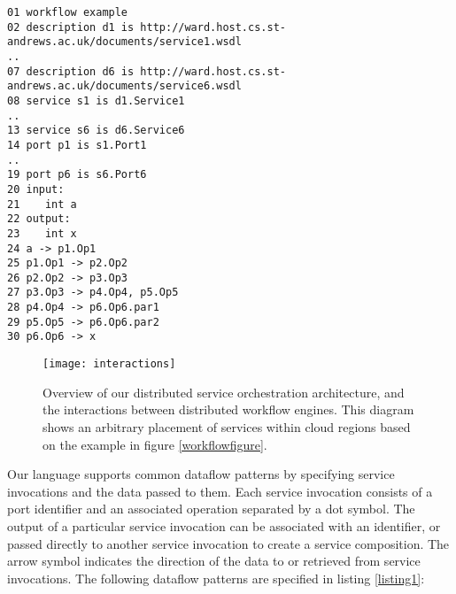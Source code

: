 \documentclass[10pt, conference, compsocconf]{IEEEtran}
\begin{document}
\begin{lstlisting}[keywords={workflow, specification, engine, description, service, port, engine, is, input, output, int, any}, caption={Specification of the workflow in figure \ref{workflowfigure}.}, label={listing1}, frame=single]
01 workflow example
02 description d1 is http://ward.host.cs.st-andrews.ac.uk/documents/service1.wsdl
..
07 description d6 is http://ward.host.cs.st-andrews.ac.uk/documents/service6.wsdl
08 service s1 is d1.Service1
..
13 service s6 is d6.Service6
14 port p1 is s1.Port1
..
19 port p6 is s6.Port6
20 input: 
21    int a
22 output:
23    int x
24 a -> p1.Op1
25 p1.Op1 -> p2.Op2
26 p2.Op2 -> p3.Op3
27 p3.Op3 -> p4.Op4, p5.Op5
28 p4.Op4 -> p6.Op6.par1
29 p5.Op5 -> p6.Op6.par2
30 p6.Op6 -> x
\end{lstlisting}

\begin{figure*}[b]
\centerline{\texttt{[image: interactions]}}
\caption{Overview of our distributed service orchestration architecture, and the interactions between distributed workflow engines. This diagram shows an arbitrary placement of services within cloud regions based on the example in figure \ref{workflowfigure}.}
\label{architecture}
\end{figure*}

Our language supports common dataflow patterns by specifying service invocations and the data passed to them.
Each service invocation consists of a port identifier and an associated operation separated by a dot symbol.
The output of a particular service invocation can be associated with an identifier, or passed directly to another service invocation to create a service composition.
The arrow symbol indicates the direction of the data to or retrieved from service invocations.
The following dataflow patterns are specified in listing \ref{listing1}:
\end{document}
